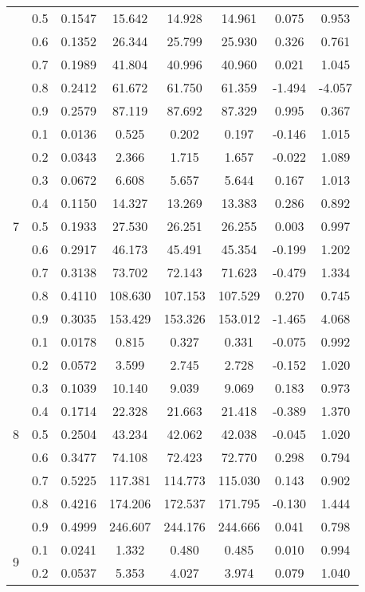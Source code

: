 \documentclass[11pt,a4paper]{report}
\begin{document}
\begin{longtable}{ | c | c || c | c | c | c | c | c | }
 & 0.5 & 0.1547 & 15.642 & 14.928 & 14.961 & 0.075 & 0.953 \\
 & 0.6 & 0.1352 & 26.344 & 25.799 & 25.930 & 0.326 & 0.761 \\
 & 0.7 & 0.1989 & 41.804 & 40.996 & 40.960 & 0.021 & 1.045 \\
 & 0.8 & 0.2412 & 61.672 & 61.750 & 61.359 & -1.494 & -4.057 \\
 & 0.9 & 0.2579 & 87.119 & 87.692 & 87.329 & 0.995 & 0.367 \\
 \hline
\multirow{9}{*}{7} & 0.1 & 0.0136 & 0.525 & 0.202 & 0.197 & -0.146 & 1.015 \\
 & 0.2 & 0.0343 & 2.366 & 1.715 & 1.657 & -0.022 & 1.089 \\
 & 0.3 & 0.0672 & 6.608 & 5.657 & 5.644 & 0.167 & 1.013 \\
 & 0.4 & 0.1150 & 14.327 & 13.269 & 13.383 & 0.286 & 0.892 \\
 & 0.5 & 0.1933 & 27.530 & 26.251 & 26.255 & 0.003 & 0.997 \\
 & 0.6 & 0.2917 & 46.173 & 45.491 & 45.354 & -0.199 & 1.202 \\
 & 0.7 & 0.3138 & 73.702 & 72.143 & 71.623 & -0.479 & 1.334 \\
 & 0.8 & 0.4110 & 108.630 & 107.153 & 107.529 & 0.270 & 0.745 \\
 & 0.9 & 0.3035 & 153.429 & 153.326 & 153.012 & -1.465 & 4.068 \\
 \hline
\multirow{9}{*}{8} & 0.1 & 0.0178 & 0.815 & 0.327 & 0.331 & -0.075 & 0.992 \\
 & 0.2 & 0.0572 & 3.599 & 2.745 & 2.728 & -0.152 & 1.020 \\
 & 0.3 & 0.1039 & 10.140 & 9.039 & 9.069 & 0.183 & 0.973 \\
 & 0.4 & 0.1714 & 22.328 & 21.663 & 21.418 & -0.389 & 1.370 \\
 & 0.5 & 0.2504 & 43.234 & 42.062 & 42.038 & -0.045 & 1.020 \\
 & 0.6 & 0.3477 & 74.108 & 72.423 & 72.770 & 0.298 & 0.794 \\
 & 0.7 & 0.5225 & 117.381 & 114.773 & 115.030 & 0.143 & 0.902 \\
 & 0.8 & 0.4216 & 174.206 & 172.537 & 171.795 & -0.130 & 1.444 \\
 & 0.9 & 0.4999 & 246.607 & 244.176 & 244.666 & 0.041 & 0.798 \\
 \hline
\multirow{9}{*}{9} & 0.1 & 0.0241 & 1.332 & 0.480 & 0.485 & 0.010 & 0.994 \\
 & 0.2 & 0.0537 & 5.353 & 4.027 & 3.974 & 0.079 & 1.040 \\

\end{longtable}
\end{document}
